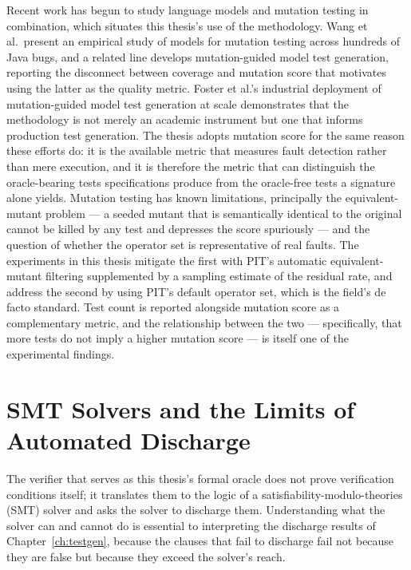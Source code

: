 Recent work has begun to study language models and mutation testing in
combination, which situates this thesis's use of the methodology. Wang et al.\
present an empirical study of models for mutation testing across hundreds of Java
bugs, and a related line develops mutation-guided model test generation, reporting
the disconnect between coverage and mutation score that motivates using the latter
as the quality metric. Foster et al.'s industrial deployment of mutation-guided
model test generation at scale demonstrates that the methodology is not merely an
academic instrument but one that informs production test generation. The thesis
adopts mutation score for the same reason these efforts do: it is the available
metric that measures fault detection rather than mere execution, and it is
therefore the metric that can distinguish the oracle-bearing tests specifications
produce from the oracle-free tests a signature alone yields. Mutation testing has known
limitations, principally the equivalent-mutant problem --- a seeded mutant
that is semantically identical to the original cannot be killed by any test
and depresses the score spuriously --- and the question of whether the
operator set is representative of real faults. The experiments in this thesis
mitigate the first with PIT's automatic equivalent-mutant filtering
supplemented by a sampling estimate of the residual rate, and address the
second by using PIT's default operator set, which is the field's de facto
standard. Test count is reported alongside mutation score as a complementary
metric, and the relationship between the two --- specifically, that more tests
do not imply a higher mutation score --- is itself one of the experimental
findings.

\section{SMT Solvers and the Limits of Automated Discharge}
\label{sec:bg-smt}

The verifier that serves as this thesis's formal oracle does not prove
verification conditions itself; it translates them to the logic of a
satisfiability-modulo-theories (SMT) solver and asks the solver to discharge
them. Understanding what the solver can and cannot do is essential to
interpreting the discharge results of Chapter~\ref{ch:testgen}, because the
clauses that fail to discharge fail not because they are false but because they
exceed the solver's reach.

